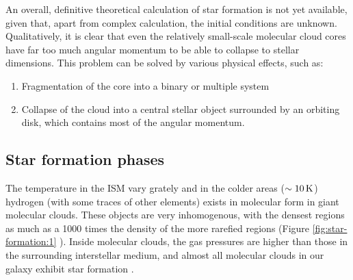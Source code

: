 An overall, definitive theoretical calculation of star formation is not yet available, given that, apart from complex calculation, the initial conditions are unknown. Qualitatively, it is clear that even the relatively small-scale molecular cloud cores have far too much angular momentum to be able to collapse to stellar dimensions. This problem can be solved by various physical effects, such as:

\begin{enumerate}
\item Fragmentation of the core into a binary or multiple system
\item Collapse of the cloud into a central stellar object surrounded by an orbiting disk,
which contains most of the angular momentum.
\end{enumerate}

\subsection{Star formation phases}

The temperature in the ISM vary grately and in the colder areas ($\rm{\sim 10\, K}$) hydrogen (with some traces of other elements) exists in molecular form in giant molecular clouds. These objects are very inhomogenous, with the densest regions as much as a 1000 times the density of the more rarefied regions (Figure \ref{fig:star-formation:1} \citep{Greene2001}). Inside molecular clouds, the gas pressures are higher than those in the surrounding interstellar medium, and almost all molecular clouds in our galaxy exhibit star formation \citep{Bodenheimer2011}.

